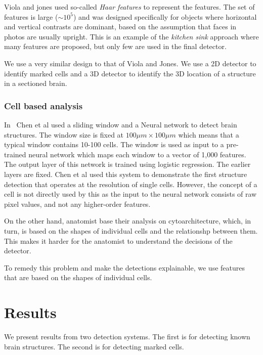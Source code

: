 \documentclass[11pt]{article}
\begin{document}
Viola and jones used so-called {\em Haar features} to represent the
features. The set of features is large ($\sim 10^5$) and was designed
specifically for objects where horizontal and vertical contrasts are
dominant, based on the assumption that faces in photos are usually
upright. This is an example of the {\em kitchen sink} approach where
many features are proposed, but only few are used in the final detector.

We use a very similar design to that of Viola and Jones. We use a 2D
detector to identify marked cells and a 3D detector to identify the 3D
location of a structure in a sectioned brain.

\subsubsection{Cell based analysis}

In~\cite{chen2019active} Chen et al used a sliding window and a
Neural network to detect brain structures. The window size is fixed at
$100 \mu m \times 100 \mu m$ which means that a typical window contains 10-100 cells.
The window is used as input to a pre-trained neural network which maps
each window to a vector of 1,000 features. The output layer of
this network is trained using logistic regression. The earlier layers
are fixed. Chen et al used this system to demonstrate the first
structure detection that operates at the resolution of single cells.
However, the concept of a cell is not directly used by this as the
input to the neural network consists of raw pixel values, and not any
higher-order features.

On the other hand, anatomist base their analysis on cytoarchitecture,
which, in turn, is based on the shapes of individual cells and the
relationshp between them. This makes it harder for the anatomist to
understand the decisions of the detector.

To remedy this problem and make the detections explainable, we use
features that are based on the shapes of individual cells.

\section{Results}

We present results from two detection systems. The first is for detecting known
brain structures. The second is for detecting marked cells. 
\end{document}
